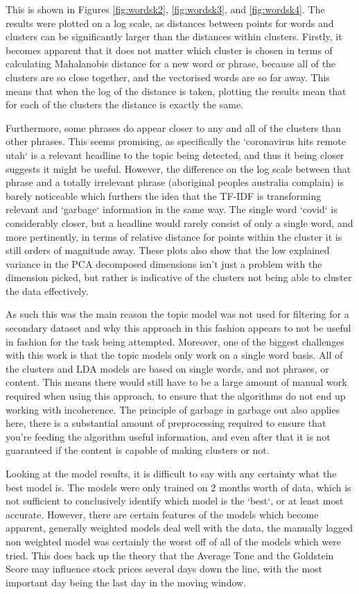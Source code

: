 This is shown in Figures \ref{fig:wordsk2}, \ref{fig:wordsk3}, and \ref{fig:wordsk4}. The results were plotted on a log scale, as distances between points for words and clusters can be significantly larger than the distances within clusters. Firstly, it becomes apparent that it does not matter which cluster is chosen in terms of calculating Mahalanobis distance for a new word or phrase, because all of the clusters are so close together, and the vectorised words are so far away. This means that when the log of the distance is taken, plotting the results mean that for each of the clusters the distance is exactly the same. 

Furthermore, some phrases do appear closer to any and all of the clusters than other phrases. This seems promising, as specifically the `coronavirus hits remote utah` is a relevant headline to the topic being detected, and thus it being closer suggests it might be useful. However, the difference on the log scale between that phrase and a totally irrelevant phrase (aboriginal peoples australia complain) is barely noticeable which furthers the idea that the TF-IDF is transforming relevant and `garbage` information in the same way. The single word `covid` is considerably closer, but a headline would rarely consist of only a single word, and more pertinently, in terms of relative distance for points within the cluster it is still orders of magnitude away. These plots also show that the low explained variance in the PCA decomposed dimensions isn't just a problem with the dimension picked, but rather is indicative of the clusters not being able to cluster the data effectively. 

As such this was the main reason the topic model was not used for filtering for a secondary dataset and why this approach in this fashion appears to not be useful in fashion for the task being attempted. Moreover, one of the biggest challenges with this work is that the topic models only work on a single word basis. All of the clusters and LDA models are based on single words, and not phrases, or content. This means there would still have to be a large amount of manual work required when using this approach, to ensure that the algorithms do not end up working with incoherence. The principle of garbage in garbage out also applies here, there is a substantial amount of preprocessing required to ensure that you're feeding the algorithm useful information, and even after that it is not guaranteed if the content is capable of making clusters or not.

Looking at the model results, it is difficult to say with any certainty what the best model is. The models were only trained on 2 months worth of data, which is not sufficient to conclusively identify which model is the `best`, or at least most accurate. However, there are certain features of the models which become apparent, generally weighted models deal well with the data, the manually lagged non weighted model was certainly the worst off of all of the models which were tried. This does back up the theory that the Average Tone and the Goldstein Score may influence stock prices several days down the line, with the most important day being the last day in the moving window.

